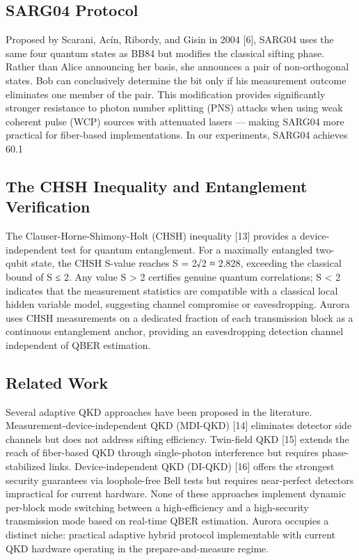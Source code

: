 \subsection{SARG04 Protocol}
Proposed by Scarani, Acín, Ribordy, and Gisin in 2004 [6], SARG04 uses the same four quantum states as BB84 but modifies the classical sifting phase. Rather than Alice announcing her basis, she announces a pair of non-orthogonal states. Bob can conclusively determine the bit only if his measurement outcome eliminates one member of the pair. This modification provides significantly stronger resistance to photon number splitting (PNS) attacks when using weak coherent pulse (WCP) sources with attenuated lasers — making SARG04 more practical for fiber-based implementations. In our experiments, SARG04 achieves 60.1%

\subsection{The CHSH Inequality and Entanglement Verification}
The Clauser-Horne-Shimony-Holt (CHSH) inequality [13] provides a device-independent test for quantum entanglement. For a maximally entangled two-qubit state, the CHSH S-value reaches S = 2√2 ≈ 2.828, exceeding the classical bound of S ≤ 2. Any value S > 2 certifies genuine quantum correlations; S < 2 indicates that the measurement statistics are compatible with a classical local hidden variable model, suggesting channel compromise or eavesdropping. Aurora uses CHSH measurements on a dedicated fraction of each transmission block as a continuous entanglement anchor, providing an eavesdropping detection channel independent of QBER estimation.

\subsection{Related Work}
Several adaptive QKD approaches have been proposed in the literature. Measurement-device-independent QKD (MDI-QKD) [14] eliminates detector side channels but does not address sifting efficiency. Twin-field QKD [15] extends the reach of fiber-based QKD through single-photon interference but requires phase-stabilized links. Device-independent QKD (DI-QKD) [16] offers the strongest security guarantees via loophole-free Bell tests but requires near-perfect detectors impractical for current hardware. None of these approaches implement dynamic per-block mode switching between a high-efficiency and a high-security transmission mode based on real-time QBER estimation. Aurora occupies a distinct niche: practical adaptive hybrid protocol implementable with current QKD hardware operating in the prepare-and-measure regime.

